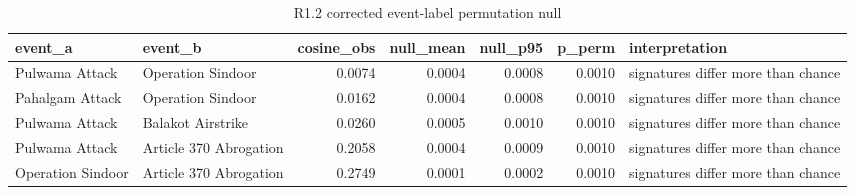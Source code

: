 \begin{table}
\caption{R1.2 corrected event-label permutation null}
\label{tab:r1r2_cosine_permutation_null}
\begin{tabular}{llrrrrl}
\toprule
event\_a & event\_b & cosine\_obs & null\_mean & null\_p95 & p\_perm & interpretation \\
\midrule
Pulwama Attack & Operation Sindoor & 0.0074 & 0.0004 & 0.0008 & 0.0010 & signatures differ more than chance \\
Pahalgam Attack & Operation Sindoor & 0.0162 & 0.0004 & 0.0008 & 0.0010 & signatures differ more than chance \\
Pulwama Attack & Balakot Airstrike & 0.0260 & 0.0005 & 0.0010 & 0.0010 & signatures differ more than chance \\
Pulwama Attack & Article 370 Abrogation & 0.2058 & 0.0004 & 0.0009 & 0.0010 & signatures differ more than chance \\
Operation Sindoor & Article 370 Abrogation & 0.2749 & 0.0001 & 0.0002 & 0.0010 & signatures differ more than chance \\
\bottomrule
\end{tabular}
\end{table}
